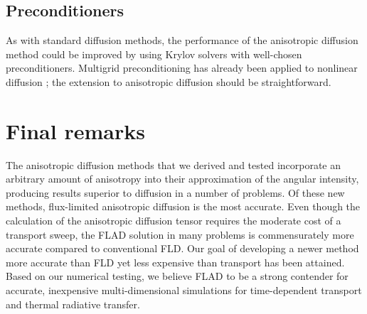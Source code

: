 \subsection{Preconditioners}

As with standard diffusion methods, the performance of the anisotropic diffusion method could be improved
by using Krylov solvers with well-chosen preconditioners. Multigrid
preconditioning has already been applied to nonlinear diffusion \cite{Rid1999};
the extension to anisotropic diffusion should be straightforward.

\section{Final remarks}

The anisotropic diffusion methods that we derived and tested incorporate an
arbitrary amount of anisotropy into their approximation of the angular
intensity, producing results superior to diffusion in a number of problems. Of
these new methods, flux-limited anisotropic diffusion is the most accurate.
Even though the calculation of the anisotropic diffusion tensor
requires the moderate cost of a transport sweep, the FLAD solution in many
problems is commensurately more accurate compared to conventional FLD. Our
goal of developing a newer method more accurate than FLD yet less expensive
than transport has been attained. Based on
our numerical testing, we believe FLAD to be a strong contender for
accurate, inexpensive multi-dimensional simulations for time-dependent
transport and thermal radiative transfer.

